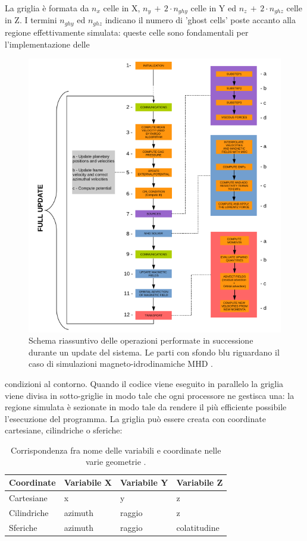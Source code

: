 La griglia è formata da $n_x$ celle in X, $n_y\,+\,2\cdot n_{ghy}$ celle in Y ed $n_z\,+\,2\cdot n_{ghz}$ celle in Z. I termini $ n_{ghy}$ ed  $n_{ghz}$ indicano il numero di 'ghost cells' poste accanto alla regione effettivamente simulata: queste celle sono fondamentali per l'implementazione delle 
\begin{figure}[H]
    \centering
    \includegraphics[width=\textwidth]{Immagini/Simulazioni/Update_FARGO.png}
    \caption{Schema riassuntivo delle operazioni performate in successione durante un update del sistema. Le parti con sfondo blu riguardano il caso di simulazioni magneto-idrodinamiche MHD \parencite{Fargo3D}.}
    \label{fig:update_far}
\end{figure}
condizioni al contorno.
Quando il codice viene eseguito in parallelo la griglia viene divisa in sotto-griglie in modo tale che ogni processore ne gestisca una: la regione simulata è sezionate in modo tale da rendere il più efficiente possibile l'esecuzione del programma.
La griglia può essere creata con coordinate cartesiane, cilindriche o sferiche:
\begin{table}[H]
\begin{center}
\begin{tabular}{|C{2cm}|C{2.5cm}|C{2.5cm}|C{2.5cm}|}
\hline
{}
Coordinate & Variabile X & Variabile Y & Variabile Z\\
\hline
Cartesiane & x & y & z \\
\hline
Cilindriche & azimuth & raggio & z  \\
\hline
Sferiche & azimuth & raggio & colatitudine \\
\hline
\end{tabular}
\caption{Corrispondenza fra nome delle variabili e coordinate nelle varie geometrie \parencite{Fargo3D}.}
\label{tab:coor_Fargo3D}
\end{center}
\end{table}
